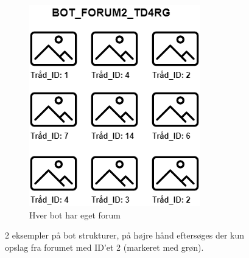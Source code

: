 \begin{figure}[H]
\begin{subfigure}{0.5\textwidth}
        \includegraphics[width=0.70\linewidth]{Projectdoc/Assets/Illustrationer/bot-structure-2.png}
        \caption{Hver bot har eget forum}
        \label{fig:bot_structured}
    \end{subfigure}
    \caption{2 eksempler på bot strukturer, på højre hånd eftersøges der kun opslag fra forumet med ID'et 2 (markeret med grøn).}
    \label{fig:bot_structure}
\end{figure}

